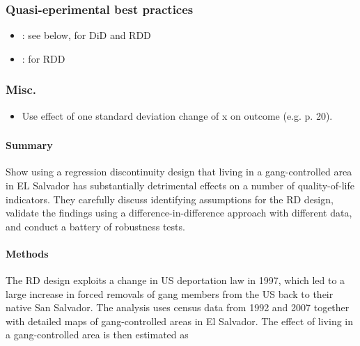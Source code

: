 \subsubsection*{Quasi-eperimental best practices}

\begin{itemize}
	\item \citet{melnikov2019gangs}: see below, for DiD and RDD
	\item \citet{middleton2018lifting}: for RDD
\end{itemize}

\subsubsection{Misc.}

\begin{itemize}

    \item Use effect of one standard deviation change of x on outcome (e.g.
        \citet{ameriks2003wealth} p. 20).

\end{itemize}


\subsubsection*{\citet{melnikov2019gangs}}

\paragraph{Summary}
Show using a regression discontinuity design that living in a gang-controlled area in EL Salvador has substantially detrimental effects on a number of quality-of-life indicators. They carefully discuss identifying assumptions for the RD design, validate the findings using a difference-in-difference approach with different data, and conduct a battery of robustness tests.

\paragraph{Methods}
The RD design exploits a change in US deportation law in 1997, which led to a large increase in forced removals of gang members from the US back to their native San Salvador. The analysis uses census data from 1992 and 2007 together with detailed maps of gang-controlled areas in El Salvador. The effect of living in a gang-controlled area is then estimated as

